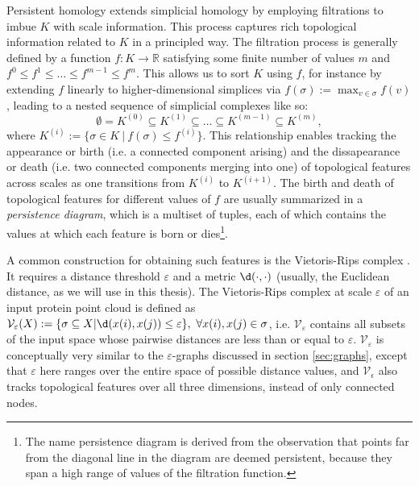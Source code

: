 Persistent homology extends simplicial homology by employing filtrations to
imbue $K$ with scale information. This process captures rich topological
information related to $K$ in a principled way. The
filtration process is generally defined by a function $f: K\to\mathbb{R}$
satisfying some finite number of values $m$ and $f^{0}\leq f^{1}\leq\dots\leq
f^{m-1}\leq f^{m}$. This allows us to sort $K$ using $f$, for instance by
extending $f$ linearly to higher-dimensional simplices via
$f(\sigma):=\max_{v\in\sigma}f(v)$, leading to a nested sequence of simplicial
complexes like so:
\begin{equation}
  \label{eq:nested_simplicial_complexes}
  \emptyset=K^{(0)}\subseteq K^{(1)}\subseteq \dots\subseteq K^{(m-1)}\subseteq K^{(m)},
\end{equation}
where $K^{(i)}:=\{\sigma\in K\ |\ f(\sigma)\leq f^{(i)}\}$. This relationship
enables tracking the appearance or birth (i.e. a connected component arising)
and the dissapearance or death (i.e. two connected components merging into one)
of topological features across scales as one transitions from $K^{(i)}$ to
$K^{(i+1)}$. The birth and death of topological features for different values of
$f$ are usually summarized in a \emph{persistence diagram}, which is a multiset
of tuples, each of which contains the values at which each feature is born or
dies\footnote{The name persistence diagram is derived from the observation that
  points far from the diagonal line in the diagram are deemed persistent,
  because they span a high range of values of the filtration function.}.

A common construction for obtaining such features is the Vietoris-Rips complex
\citep{vietoris1927hoheren}. It requires a distance threshold $\varepsilon$ and
a metric $\d( \cdot, \cdot)$ (usually, the Euclidean distance, as we will
use in this thesis). The Vietoris-Rips complex at scale $\varepsilon$ of an
input protein point cloud is defined as
$\mathcal{V}_{\varepsilon}(X):=\{\sigma\subseteq X| \d(x(i),
x(j))\leq\varepsilon\},\ \forall x(i),x(j)\in\sigma$, i.e.
$\mathcal{V}_{\varepsilon}$ contains all subsets of the input space whose
pairwise distances are less than or equal to $\varepsilon$.
$\mathcal{V}_{\varepsilon}$ is conceptually very similar to the
$\varepsilon$-graphs discussed in section \ref{sec:graphs}, except that
$\varepsilon$ here ranges over the entire space of possible distance values, and
$\mathcal{V}_{\epsilon}$ also tracks topological features over all three
dimensions, instead of only connected nodes.

